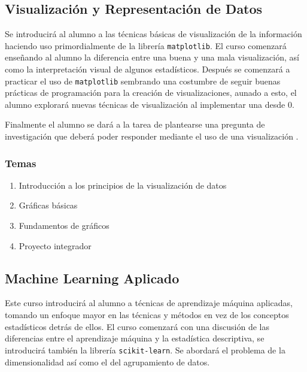 \documentclass{article}
\begin{document}
        \subsection{Visualización y Representación de Datos}

            Se introducirá al alumno a las técnicas básicas de visualización de la información haciendo uso primordialmente de la librería \texttt{matplotlib}. El curso comenzará enseñando al alumno la diferencia entre una buena y una mala visualización, así como la interpretación visual de algunos estadísticos. Después se comenzará a practicar el uso de \texttt{matplotlib} sembrando una costumbre de seguir buenas prácticas de programación para la creación de visualizaciones, aunado a esto, el alumno explorará nuevas técnicas de visualización al implementar una desde 0. 
            
            Finalmente el alumno se dará a la tarea de plantearse una pregunta de investigación que deberá poder responder mediante el uso de una visualización \cite{plotting}.

            \subsubsection{Temas}

                \begin{enumerate}
                    \item Introducción a los principios de la visualización de datos
                    \item Gráficas básicas
                    \item Fundamentos de gráficos
                    \item Proyecto integrador
                \end{enumerate}

        \subsection{Machine Learning Aplicado}

            Este curso introducirá al alumno a técnicas de aprendizaje máquina aplicadas, tomando un enfoque mayor en las técnicas y métodos en vez de los conceptos estadísticos detrás de ellos. El curso comenzará con una discusión de las diferencias entre el aprendizaje máquina y la estadística descriptiva, se introducirá también la librería \texttt{scikit-learn}. Se abordará el problema de la dimensionalidad así como el del agrupamiento de datos.
\end{document}
